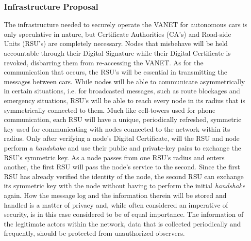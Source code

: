 \documentclass[conference,compsoc]{IEEEtran}
\begin{document}
\subsubsection{Infrastructure Proposal}
The infrastructure needed to securely operate the VANET for autonomous cars is only speculative in nature, but Certificate Authorities (CA’s) and Road-side Units (RSU’s) are completely necessary. Nodes that misbehave will be held accountable through their Digital Signature while their Digital Certificate is revoked, disbarring them from re-accessing the VANET. As for the communication that occurs, the RSU’s will be essential in transmitting the messages between cars. While nodes will be able to communicate asymmetrically in certain situations, i.e. for broadcasted messages, such as route blockages and emergency situations, RSU’s will be able to reach every node in its radius that is symmetrically connected to them. Much like cell-towers used for phone communication, each RSU will have a unique, periodically refreshed, symmetric key used for communicating with nodes connected to the network within its radius. Only after verifying a node’s Digital Certificate, will the RSU and node perform a \emph{handshake} and use their public and private-key pairs to exchange the RSU’s symmetric key. As a node passes from one RSU’s radius and enters another, the first RSU will pass the node’s service to the second. Since the first RSU has already verified the identity of the node, the second RSU can exchange its symmetric key with the node without having to perform the initial \emph{handshake} again. How the message log and the information therein will be stored and handled is a matter of privacy and, while often considered an imperative of security, is in this case considered to be of equal importance. The information of the legitimate actors within the network, data that is collected periodically and frequently, should be protected from unauthorized observers.
\end{document}
